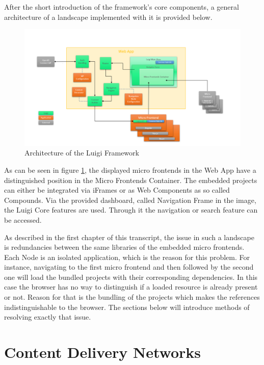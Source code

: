 After the short introduction of the framework's core components, a general architecture of a landscape implemented with it is provided below.

\begin{figure}[!h]
	\centering
	\includegraphics[width=1\textwidth]{Figures/Luigi_Architektur.png}
	\caption{Architecture of the Luigi Framework \cite{luigi_architecture}}
	\label{fig:luigi_architecture_fig}
\end{figure}

As can be seen in figure \ref{fig:luigi_architecture_fig}, the displayed micro frontends in the Web App have a distinguished position in the Micro Frontends Container. The embedded projects can either be integrated via iFrames or as Web Components as so called Compounds.
Via the provided dashboard, called Navigation Frame in the image, the Luigi Core features are used. Through it the navigation or search feature can be accessed.

As described in the first chapter of this transcript, the issue in such a landscape is redundancies between the same libraries of the embedded micro frontends. Each Node is an isolated application, which is the reason for this problem.
For instance, navigating to the first micro frontend and then followed by the second one will load the bundled projects with their corresponding dependencies. In this case the browser has no way to distinguish if a loaded resource is already present or not. Reason for that is the bundling of the projects which makes the references indistinguishable to the browser.
The sections below will introduce methods of resolving exactly that issue. 

\section{Content Delivery Networks}
\label{cdn_intro}

